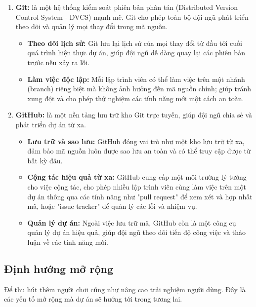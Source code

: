 \begin{enumerate}
    \item \textbf{Git:}
    là một hệ thống kiểm soát phiên bản phân tán (Distributed Version Control System - DVCS) mạnh mẽ. Git cho phép toàn bộ đội ngũ phát triển theo dõi và quản lý mọi thay đổi trong mã nguồn.
    \begin{itemize}
        \item \textbf{Theo dõi lịch sử:}
        Git lưu lại lịch sử của mọi thay đổi từ đầu tới cuối quá trình hiện thực dự án, giúp đội ngũ dễ dàng quay lại các phiên bản trước nếu xảy ra lỗi.

        \item \textbf{Làm việc độc lập:}
        Mỗi lập trình viên có thể làm việc trên một nhánh (branch) riêng biệt mà không ảnh hưởng đến mã nguồn chính; giúp tránh xung đột và cho phép thử nghiệm các tính năng mới một cách an toàn.
    \end{itemize}

    \item \textbf{GitHub:} 
    là một nền tảng lưu trữ kho Git trực tuyến, giúp đội ngũ chia sẻ và phát triển dự án từ xa.
    \begin{itemize}
        \item \textbf{Lưu trữ và sao lưu:}
        GitHub đóng vai trò như một kho lưu trữ từ xa, đảm bảo mã nguồn luôn được sao lưu an toàn và có thể truy cập được từ bất kỳ đâu.

        \item \textbf{Cộng tác hiệu quả từ xa:}
        GitHub cung cấp một môi trường lý tưởng cho việc cộng tác, cho phép nhiều lập trình viên cùng làm việc trên một dự án thông qua các tính năng như "pull request" để xem xét và hợp nhất mã, hoặc "issue tracker" để quản lý các lỗi và nhiệm vụ.

        \item \textbf{Quản lý dự án:}
        Ngoài việc lưu trữ mã, GitHub còn là một công cụ quản lý dự án hiệu quả, giúp đội ngũ theo dõi tiến độ công việc và thảo luận về các tính năng mới.
    \end{itemize}
    
\end{enumerate}

\subsection{Định hướng mở rộng}
Để thu hút thêm người chơi cũng như nâng cao trải nghiệm người dùng. Đây là các yếu tố mở rộng mà dự án sẽ hướng tới trong tương lai.

